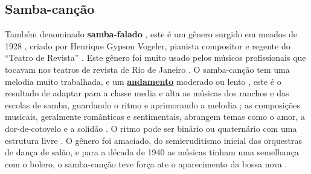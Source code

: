 \subsection{Samba-canção}
Também denominado \textbf{samba-falado} \cite[pp. 63]{reinato2010musica},
este é um gênero surgido em meados de 1928 \cite[pp. 63]{reinato2010musica} \cite[pp. 291]{dourado2004dicionario},
criado por Henrique Gypson Vogeler, pianista compositor e regente do ``Teatro de Revista'' \cite[pp. 63]{reinato2010musica}. 
Este gênero foi muito usado pelos músicos profissionais que tocavam nos teatros de revista de Rio de Janeiro \cite[pp. 291]{dourado2004dicionario}.
O samba-canção tem uma melodia muito trabalhada, 
e um \hyperref[sec:Andamento]{\textbf{andamento}} moderado \cite[pp. 291]{dourado2004dicionario} ou lento \cite[pp. 63]{reinato2010musica}, 
este é o resultado de adaptar para a classe media e alta as músicas dos ranchos e das escolas de samba, 
guardando o ritmo e aprimorando a melodia \cite[pp. 4]{musicasambavariasdef1} \cite[pp. 128]{perna2002samba}; 
as composições musicais, geralmente românticas e sentimentais, abrangem temas como o amor, a dor-de-cotovelo e a solidão \cite{subgenerosdosamba2} \cite[pp. 291]{dourado2004dicionario}.
O ritmo pode ser binário ou quaternário com uma estrutura livre \cite[pp. 63]{reinato2010musica}.
O gênero foi amaciado, do semieruditismo inicial das orquestras de dança de salão, 
e para a década de 1940 as músicas tinham uma semelhança com o bolero,
o samba-canção teve força ate o aparecimento da bossa nova \cite[pp. 128]{perna2002samba}.

